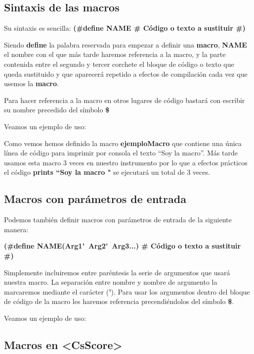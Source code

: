\subsection{Sintaxis de las macros}

Su sintaxis es sencilla: \textbf{(\#define NAME \# Código o texto a sustituir \#)}

Siendo \textbf{define} la palabra reservada para empezar a definir una \textbf{macro}, \textbf{NAME} el nombre con el que más tarde haremos referencia a la macro, y la parte contenida entre el segundo y tercer corchete el bloque de código o texto que queda sustituido y que aparecerá repetido a efectos de compilación cada vez que usemos la \textbf{macro}.

Para hacer referencia a la macro en otros lugares de código bastará con escribir su nombre precedido del símbolo \textbf{\$}

Veamos un ejemplo de uso:


Como vemos hemos definido la macro \textbf{ejemploMacro} que contiene una única línea de código para imprimir por consola el texto ``Soy la macro''. Más tarde usamos esta macro 3 veces en nuestro instrumento por lo que a efectos prácticos el código \textbf{prints ``Soy la macro "} se ejecutará un total de 3 veces.

\subsection{Macros con parámetros de entrada}

Podemos también definir macros con parámetros de entrada de la siguiente manera: 

\textbf{(\#define NAME(Arg1'\ Arg2'\ Arg3...) \# Código o texto a sustituir \#)}

Simplemente incluiremos entre paréntesis la serie de argumentos que usará nuestra macro. La separación entre nombre y nombre de argumento la marcaremos mediante el carácter (\textbf{'}). Para usar los argumentos dentro del bloque de código de la macro les haremos referencia precendiéndolos del símbolo \textbf{\$}.

Veamos un ejemplo de uso:


\subsection{Macros en \textless CsScore\textgreater}

